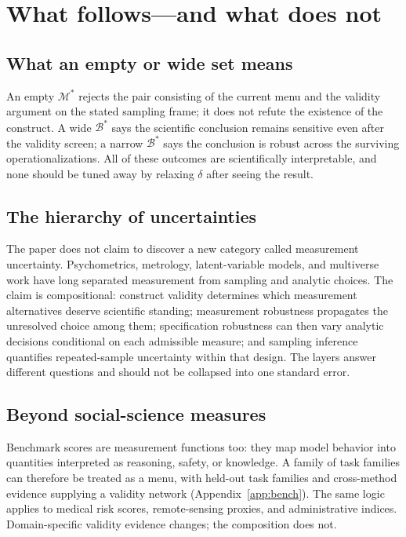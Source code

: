 \documentclass[10pt,letterpaper]{article}
\newcommand{\M}{\ensuremath{\mathcal{M}}}
\newcommand{\Bset}{\mathcal{B}}
\begin{document}
\section{What follows---and what does not}
\label{sec:discussion}

\subsection{What an empty or wide set means}
An empty $\M^*$ rejects the pair consisting of the current menu and the validity argument on the stated sampling frame; it does not refute the existence of the construct.
A wide $\Bset^*$ says the scientific conclusion remains sensitive even after the validity screen; a narrow $\Bset^*$ says the conclusion is robust across the surviving operationalizations.
All of these outcomes are scientifically interpretable, and none should be tuned away by relaxing $\delta$ after seeing the result.

\subsection{The hierarchy of uncertainties}
The paper does not claim to discover a new category called measurement uncertainty.
Psychometrics, metrology, latent-variable models, and multiverse work have long separated measurement from sampling and analytic choices.
The claim is compositional: construct validity determines which measurement alternatives deserve scientific standing; measurement robustness propagates the unresolved choice among them; specification robustness can then vary analytic decisions conditional on each admissible measure; and sampling inference quantifies repeated-sample uncertainty within that design.
The layers answer different questions and should not be collapsed into one standard error.

\subsection{Beyond social-science measures}
Benchmark scores are measurement functions too: they map model behavior into quantities interpreted as reasoning, safety, or knowledge.
A family of task families can therefore be treated as a menu, with held-out task families and cross-method evidence supplying a validity network (Appendix~\ref{app:bench}).
The same logic applies to medical risk scores, remote-sensing proxies, and administrative indices.
Domain-specific validity evidence changes; the composition does not.
\end{document}
